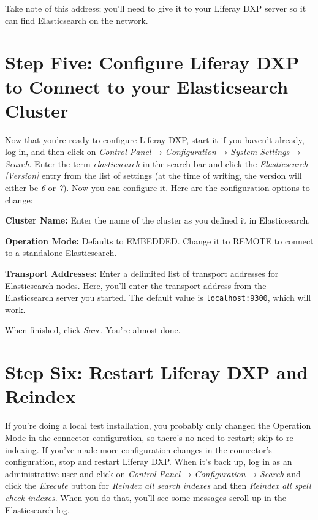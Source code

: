 Take note of this address; you'll need to give it to your Liferay DXP
server so it can find Elasticsearch on the network.

\section{Step Five: Configure Liferay DXP to Connect to your
Elasticsearch
Cluster}\label{step-five-configure-liferay-dxp-to-connect-to-your-elasticsearch-cluster}

Now that you're ready to configure Liferay DXP, start it if you haven't
already, log in, and then click on \emph{Control Panel} →
\emph{Configuration} → \emph{System Settings} → \emph{Search}. Enter the
term \emph{elasticsearch} in the search bar and click the
\emph{Elasticsearch {[}Version{]}} entry from the list of settings (at
the time of writing, the version will either be \emph{6} or \emph{7}).
Now you can configure it. Here are the configuration options to change:

\textbf{Cluster Name:} Enter the name of the cluster as you defined it
in Elasticsearch.

\textbf{Operation Mode:} Defaults to EMBEDDED. Change it to REMOTE to
connect to a standalone Elasticsearch.

\textbf{Transport Addresses:} Enter a delimited list of transport
addresses for Elasticsearch nodes. Here, you'll enter the transport
address from the Elasticsearch server you started. The default value is
\texttt{localhost:9300}, which will work.

When finished, click \emph{Save}. You're almost done.

\section{Step Six: Restart Liferay DXP and
Reindex}\label{step-six-restart-liferay-dxp-and-reindex}

If you're doing a local test installation, you probably only changed the
Operation Mode in the connector configuration, so there's no need to
restart; skip to re-indexing. If you've made more configuration changes
in the connector's configuration, stop and restart Liferay DXP. When
it's back up, log in as an administrative user and click on
\emph{Control Panel} → \emph{Configuration} → \emph{Search} and click
the \emph{Execute} button for \emph{Reindex all search indexes} and then
\emph{Reindex all spell check indexes}. When you do that, you'll see
some messages scroll up in the Elasticsearch log.

